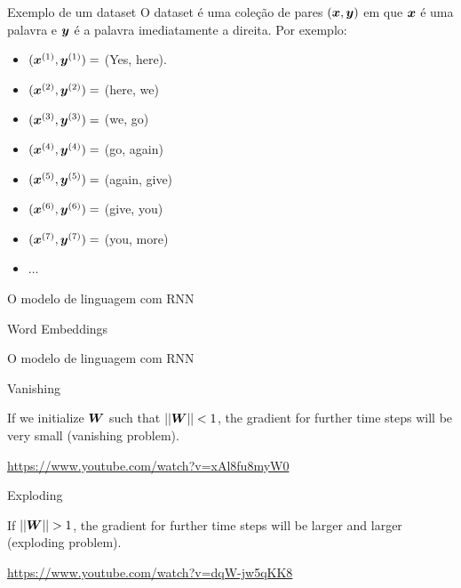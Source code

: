 \documentclass[10pt]{beamer}
\begin{document}
\begin{frame}{Exemplo de um dataset}
O dataset é uma coleção de pares $(\bm{x},\bm{y})$ em que $\bm{x}$ é uma palavra e $\bm{y}$ é a palavra imediatamente a direita. Por exemplo:
\begin{itemize}
\item [] $(\bm{x}^{(1)}, \bm{y}^{(1)}) =$ (Yes, here).
\item [] $(\bm{x}^{(2)}, \bm{y}^{(2)}) =$ (here, we)
\item [] $(\bm{x}^{(3)}, \bm{y}^{(3)}) =$ (we, go)
\item [] $(\bm{x}^{(4)}, \bm{y}^{(4)}) =$ (go, again)
\item [] $(\bm{x}^{(5)}, \bm{y}^{(5)}) =$ (again, give)
\item [] $(\bm{x}^{(6)}, \bm{y}^{(6)}) =$ (give, you)
\item [] $(\bm{x}^{(7)}, \bm{y}^{(7)}) =$ (you, more)
\item [] $\dots$
\end{itemize}
\end{frame}


\begin{frame}{O modelo de linguagem com RNN}

\end{frame}

\begin{frame}{Word Embeddings}

\end{frame}


\begin{frame}{O modelo de linguagem com RNN}

\end{frame}

\begin{frame}{Vanishing}

If we initialize $\bm{W}$ such that $||\bm{W}|| < 1$, the gradient for further time steps will be very small (\alert{vanishing problem}).

\vspace{0.8cm}
 \url{https://www.youtube.com/watch?v=xAl8fu8myW0}


\end{frame}

\begin{frame}{Exploding}

If $||\bm{W}|| > 1$, the gradient for further time steps will be larger and larger (\alert{exploding problem}).

\vspace{0.8cm}
 \url{https://www.youtube.com/watch?v=dqW-jw5qKK8}


\end{frame}
\end{document}
